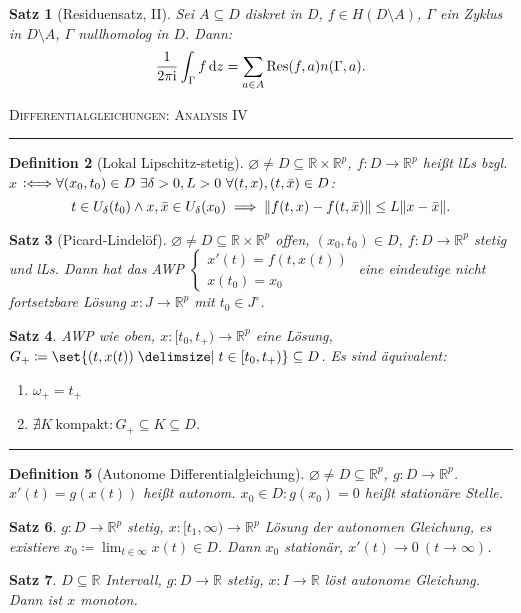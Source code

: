 \documentclass[a4paper]{article}
\newcounter{Sec}
\theoremstyle{marginbreak}
\newtheorem{definition}{Definition}[Sec]
\newtheorem{satz}[definition]{Satz}
\newcommand{\sep}{%
	\rule{\textwidth}{0.3pt}%
	\stepcounter{Sec}%
	}
\newcommand{\defiff}{\mathrel{\vcentcolon\Longleftrightarrow}}
\newcommand{\R}{\mathbb{R}}
\renewcommand{\i}{\mathrm{i}}
\begin{document}
	\begin{satz}[Residuensatz, II]
		Sei $A\subseteq D$ diskret in $D$, $f\in H(D\setminus A)$, $\Gamma$ ein Zyklus in $D\setminus A$,
		$\Gamma$ nullhomolog in $D$. Dann:
		\[
			\frac{1}{2\pi\i}\int_\Gamma f\dd{z}=\sum_{a\in A}\Res(f, a)n(\Gamma, a).
		\]
	\end{satz}
	\newpage
	\textsc{Differentialgleichungen: Analysis IV}

	\sep
	\begin{definition}[Lokal Lipschitz-stetig]
		$\varnothing\neq D\subseteq \R\times\R^p$, $f\colon D\to\R^p$ heißt lLs bzgl. $x$
		$\defiff\forall(x_0, t_0)\in D~\exists\delta>0, L>0~\forall (t, x), (t, \bar{x})\in D$:
		\[
			t\in U_\delta(t_0)\wedge x, \bar{x}\in U_\delta(x_0)\implies\norm{f(t, x)-f(t, \bar{x})}\leq L\norm{x-\bar{x}}.
		\]
	\end{definition}
	\begin{satz}[Picard-Lindelöf]
		$\varnothing\neq D\subseteq\R\times\R^p$ offen, $(x_0, t_0)\in D$, $f\colon D\to\R^p$
		stetig und lLs. Dann hat das AWP $\begin{cases}x'(t)=f(t, x(t))\\x(t_0)=x_0\end{cases}$
		eine eindeutige nicht fortsetzbare Lösung $x\colon J\to\R^p$ mit $t_0\in J^\circ$.
	\end{satz}
	\begin{satz}
		AWP wie oben, $x\colon [t_0,t_+)\to\R^p$ eine Lösung, $G_+\coloneqq\set{(t, x(t))\given t\in[t_0,t_+)}\subseteq D$.
		Es sind äquivalent:
		\begin{enumerate}[label=(\alph*)]
			\item $\omega_+=t_+$
			\item $\nexists K~\text{kompakt}: G_+\subseteq K\subseteq D$.
		\end{enumerate}
	\end{satz}
	\sep
	\begin{definition}[Autonome Differentialgleichung] %
		$\varnothing\neq D\subseteq \R^p$, $g\colon D\to\R^p$. $x'(t)=g(x(t))$ heißt autonom. $x_0\in D: g(x_0)=0$ heißt
		stationäre Stelle.
	\end{definition}
	\begin{satz}
		$g\colon D\to\R^p$ stetig, $x\colon [t_1,\infty)\to\R^p$ Lösung der autonomen Gleichung,
		es existiere $x_0\coloneqq\lim_{t\in\infty}x(t)\in D$. Dann $x_0$ stationär, $x'(t)\to 0~(t\to\infty)$.
	\end{satz}
	\begin{satz}
		$D\subseteq\R$ Intervall, $g\colon D\to\R$ stetig, $x\colon I\to\R$ löst autonome Gleichung. Dann ist $x$
		monoton.
	\end{satz}
\end{document}
